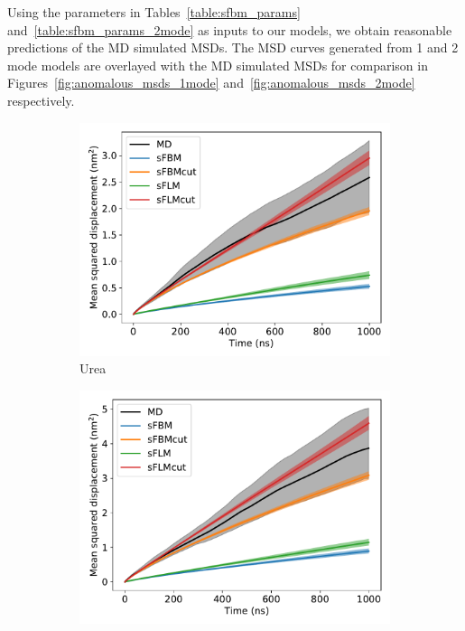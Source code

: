 \documentclass{article}
\begin{document}
  Using the parameters in Tables~\ref{table:sfbm_params} and~\ref{table:sfbm_params_2mode}
  as inputs to our models, we obtain reasonable predictions of the MD simulated MSDs. The 
  MSD curves generated from 1 and 2 mode models are overlayed with the MD simulated MSDs for 
  comparison in Figures~\ref{fig:anomalous_msds_1mode} and~\ref{fig:anomalous_msds_2mode}
  respectively. 
  
  \begin{figure}
  \centering
  \begin{subfigure}{0.45\textwidth}
  \includegraphics[width=\textwidth]{1mode_msd_comparison_URE.pdf}
  \caption{Urea}\label{fig:1mode_msd_comparison_URE}
  \end{subfigure}
  \begin{subfigure}{0.45\textwidth}
  \includegraphics[width=\textwidth]{1mode_msd_comparison_GCL.pdf}

\end{subfigure}
\end{figure}
\end{document}
